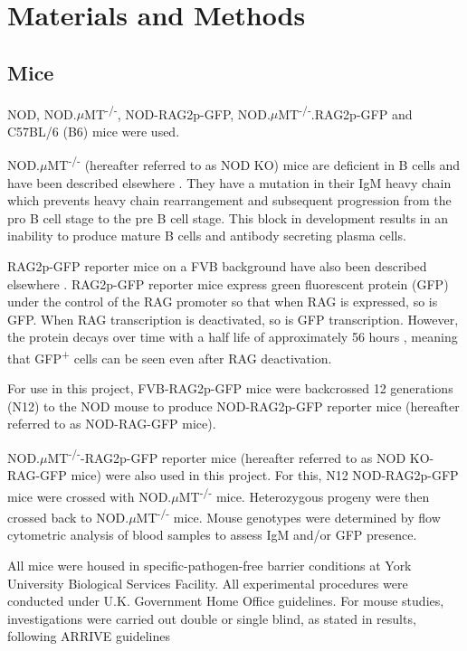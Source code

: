 
\chapter{Materials and Methods}



\section{Mice}
\label{methods:mice}

NOD, NOD.$\mu$MT\textsuperscript{-/-}, NOD-RAG2p-GFP, NOD.$\mu$MT\textsuperscript{-/-}.RAG2p-GFP and C57BL/6 (B6) mice were used.

NOD.$\mu$MT\textsuperscript{-/-} (hereafter referred to as NOD KO) mice are deficient in B cells and have been described elsewhere \citep{Serreze1996}.
They have a mutation in their IgM heavy chain which prevents heavy chain rearrangement and subsequent progression from the pro B cell stage to the pre B cell stage.
This block in development results in an inability to produce mature B cells and antibody secreting plasma cells.

RAG2p-GFP reporter mice on a FVB background have also been described elsewhere \citep{Yu1999}.
RAG2p-GFP reporter mice express green fluorescent protein (GFP) under the control of the RAG promoter so that when RAG is expressed, so is GFP.
When RAG transcription is deactivated, so is GFP transcription.
However, the protein decays over time with a half life of approximately 56 hours \citep{McCaughtry2007}, meaning that GFP\textsuperscript{+} cells can be seen even after RAG deactivation.

For use in this project, FVB-RAG2p-GFP mice were backcrossed 12 generations (N12) to the NOD mouse to produce NOD-RAG2p-GFP reporter mice (hereafter referred to as NOD-RAG-GFP mice).

NOD.$\mu$MT\textsuperscript{-/-}-RAG2p-GFP reporter mice (hereafter referred to as NOD KO-RAG-GFP mice) were also used in this project.
For this, N12 NOD-RAG2p-GFP mice were crossed with NOD.$\mu$MT\textsuperscript{-/-} mice.
Heterozygous progeny were then crossed back to NOD.$\mu$MT\textsuperscript{-/-} mice.
Mouse genotypes were determined by flow cytometric analysis of blood samples to assess IgM and/or GFP presence.

All mice were housed in specific-pathogen-free barrier conditions at York University Biological Services Facility. 
All experimental procedures were conducted under U.K. Government Home Office guidelines.
For mouse studies, investigations were carried out double or single blind, as stated in results, following ARRIVE guidelines \citep{Arriveguidelines}


